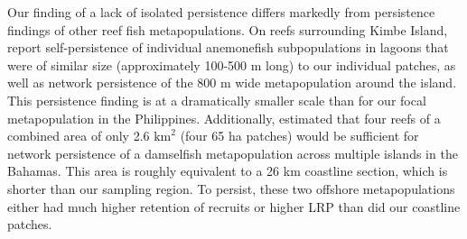 \documentclass[12pt, oneside]{article}   	%
\begin{document}

Our finding of a lack of isolated persistence differs markedly from persistence findings of other reef fish metapopulations. On reefs surrounding Kimbe Island, \cite{salles_coral_2015} report self-persistence of individual anemonefish subpopulations in lagoons that were of similar size (approximately 100-500 m long) to our individual patches, as well as network persistence of the 800 m wide metapopulation around the island. This persistence finding is at a dramatically smaller scale than for our focal metapopulation in the Philippines. Additionally, \cite{johnson2018integrating} estimated that four reefs of a combined area of only 2.6 $\text{km}^2$ (four 65 ha patches) would be sufficient for network persistence of a damselfish metapopulation across multiple islands in the Bahamas. This area is roughly equivalent to a 26 km coastline section, which is shorter than our sampling region. To persist, these two offshore metapopulations either had much higher retention of recruits or higher LRP than did our coastline patches. 
\end{document}
